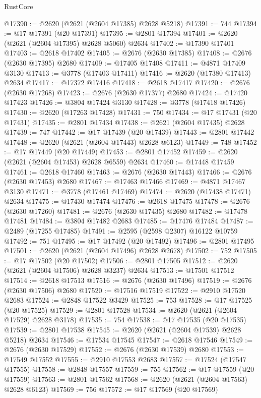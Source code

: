 \begin{lexlean}{RustCore}
\begin{coremodule}
@17390 := @2620 (@2621 (@2604 @17385) @2628 @5218)
@17391 := 744
@17394 := @17 @17391 (@20 @17391)
@17395 := @2801 @17394
@17401 := @2620 (@2621 (@2604 @17395) @2628 @5060) @2634
@17402 := @17390 @17401
@17403 := @2618 @17402
@17405 := @2676 (@2630 @17385)
@17408 := @2676 (@2630 @17395) @2680
@17409 := @17405 @17408
@17411 := @4871 @17409 @3130
@17413 := @3778 (@17403 @17411)
@17416 := @2620 (@17380 @17413) @2634
@17417 := @17372 @17416
@17418 := @2618 @17417
@17420 := @2676 (@2630 @17268)
@17423 := @2676 (@2630 @17377) @2680
@17424 := @17420 @17423
@17426 := @3804 @17424 @3130
@17428 := @3778 (@17418 @17426)
@17430 := @2620 (@17263 @17428)
@17431 := 750
@17434 := @17 @17431 (@20 @17431)
@17435 := @2801 @17434
@17438 := @2621 (@2604 @17435) @2628
@17439 := 747
@17442 := @17 @17439 (@20 @17439)
@17443 := @2801 @17442
@17448 := @2620 (@2621 (@2604 @17443) @2628 @6123)
@17449 := 748
@17452 := @17 @17449 (@20 @17449)
@17453 := @2801 @17452
@17459 := @2620 (@2621 (@2604 @17453) @2628 @6559) @2634
@17460 := @17448 @17459
@17461 := @2618 @17460
@17463 := @2676 (@2630 @17443)
@17466 := @2676 (@2630 @17453) @2680
@17467 := @17463 @17466
@17469 := @4871 @17467 @3130
@17471 := @3778 (@17461 @17469)
@17474 := @2620 (@17438 @17471) @2634
@17475 := @17430 @17474
@17476 := @2618 @17475
@17478 := @2676 (@2630 @17260)
@17481 := @2676 (@2630 @17435) @2680
@17482 := @17478 @17481
@17484 := @3804 @17482 @2683
@17485 := @17476 @17484
@17487 := @2489 (@17255 @17485)
@17491 := @2595 (@2598 @2307) @16122 @10759
@17492 := 751
@17495 := @17 @17492 (@20 @17492)
@17496 := @2801 @17495
@17501 := @2620 (@2621 (@2604 @17496) @2628 @2678)
@17502 := 752
@17505 := @17 @17502 (@20 @17502)
@17506 := @2801 @17505
@17512 := @2620 (@2621 (@2604 @17506) @2628 @3237) @2634
@17513 := @17501 @17512
@17514 := @2618 @17513
@17516 := @2676 (@2630 @17496)
@17519 := @2676 (@2630 @17506) @2680
@17520 := @17516 @17519
@17522 := @2910 @17520 @2683
@17524 := @2848 @17522 @3429
@17525 := 753
@17528 := @17 @17525 (@20 @17525)
@17529 := @2801 @17528
@17534 := @2620 (@2621 (@2604 @17529) @2628 @3178)
@17535 := 754
@17538 := @17 @17535 (@20 @17535)
@17539 := @2801 @17538
@17545 := @2620 (@2621 (@2604 @17539) @2628 @5218) @2634
@17546 := @17534 @17545
@17547 := @2618 @17546
@17549 := @2676 (@2630 @17529)
@17552 := @2676 (@2630 @17539) @2680
@17553 := @17549 @17552
@17555 := @2910 @17553 @2683
@17557 := @17524 (@17547 @17555)
@17558 := @2848 @17557
@17559 := 755
@17562 := @17 @17559 (@20 @17559)
@17563 := @2801 @17562
@17568 := @2620 (@2621 (@2604 @17563) @2628 @6123)
@17569 := 756
@17572 := @17 @17569 (@20 @17569)

\end{coremodule}
\end{lexlean}
